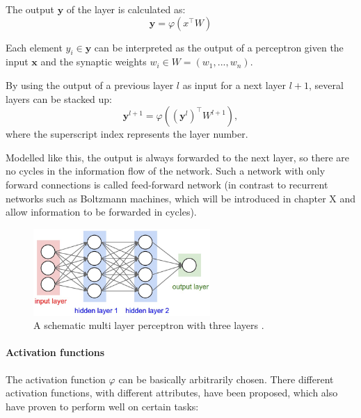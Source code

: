 The output $\textbf{y}$ of the layer is calculated as:
\[
\textbf{y} = \varphi(x^\intercal W)
\]

Each element $y_i \in \textbf{y}$ can be interpreted as the output of a perceptron given the input $\textbf{x}$ and the synaptic weights $w_i \in W = (w_1, ... , w_n)$.

By using the output of a previous layer $l$ as input for a next layer $l+1$, several layers can be stacked up: 
\[
\textbf{y}^{l+1} = \varphi ((\textbf{y}^{l})^\intercal W^{l+1} ) ,
\]
where the superscript index represents the layer number. 

Modelled like this, the output is always forwarded to the next layer, so there are no cycles in the information flow of the network.
Such a network with only forward connections is called feed-forward network (in contrast to recurrent networks such as Boltzmann machines, which will be introduced in chapter X and allow information to be forwarded in cycles).

\begin{figure}
	\centering
    	\includegraphics[width=0.6\textwidth]{imgs/mlp.jpeg} 
    \caption{A schematic multi layer perceptron with three layers \cite{mlpImg}.}
	\label{fig:mlp}
\end{figure}



\paragraph{Activation functions}

The activation function $\varphi$ can be basically arbitrarily chosen. 
There different activation functions, with different attributes, have been proposed, which also have proven to perform well on certain tasks:

